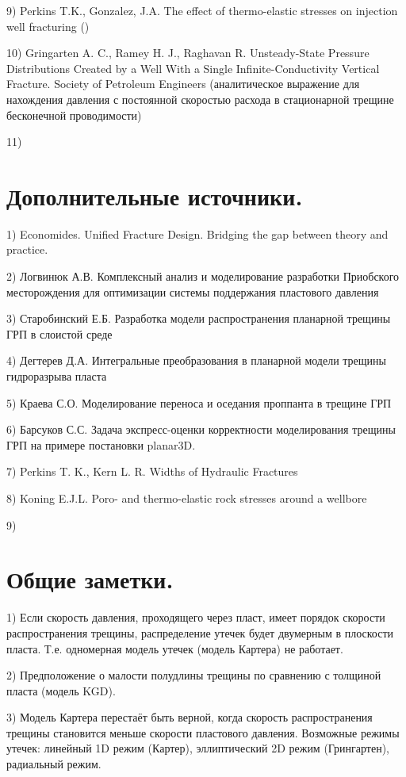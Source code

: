 \documentclass[a4paper, 11pt]{article}
\begin{document}
9) Perkins T.K., Gonzalez, J.A. The effect of thermo-elastic stresses on injection well fracturing ()

10) Gringarten A. C., Ramey H. J., Raghavan R. Unsteady-State Pressure Distributions Created by a Well With a Single Infinite-Conductivity Vertical Fracture. Society of Petroleum Engineers (аналитическое выражение для нахождения давления с постоянной скоростью расхода в стационарной трещине бесконечной проводимости)

11)
\\

\section{Дополнительные источники.}

1) Economides. Unified Fracture Design. Bridging the gap between theory and practice.

2) Логвинюк А.В. Комплексный анализ и моделирование разработки Приобского месторождения для оптимизации системы поддержания пластового давления

3) Старобинский Е.Б. Разработка модели распространения планарной трещины ГРП в слоистой среде

4) Дегтерев Д.А. Интегральные преобразования в планарной модели трещины гидроразрыва пласта

5) Краева С.О. Моделирование переноса и оседания проппанта в трещине ГРП

6) Барсуков С.С. Задача экспресс-оценки корректности моделирования трещины ГРП на примере постановки planar3D.

7) Perkins T. K., Kern L. R. Widths of Hydraulic Fractures

8) Koning E.J.L. Poro- and thermo-elastic rock stresses around a wellbore

9) 
\\


\section{Общие заметки.}

1) Если скорость давления, проходящего через пласт, имеет порядок скорости распространения трещины, распределение утечек будет двумерным в плоскости пласта. Т.е. одномерная модель утечек (модель Картера) не работает.

2) Предположение о малости полудлины трещины по сравнению с толщиной пласта (модель KGD).

3) Модель Картера перестаёт быть верной, когда скорость распространения трещины становится меньше скорости пластового давления.
Возможные режимы утечек: линейный 1D режим (Картер), эллиптический 2D режим (Грингартен), радиальный режим.
\end{document}

